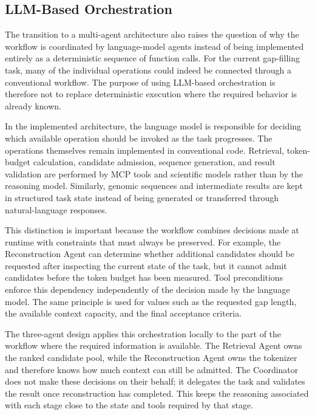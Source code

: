 \subsection{LLM-Based Orchestration}
\label{subsec:llm-orchestration}

The transition to a multi-agent architecture also raises the question of why
the workflow is coordinated by language-model agents instead of being
implemented entirely as a deterministic sequence of function calls. For the
current gap-filling task, many of the individual operations could indeed be
connected through a conventional workflow. The purpose of using LLM-based
orchestration is therefore not to replace deterministic execution where the
required behavior is already known.

In the implemented architecture, the language model is responsible for deciding
which available operation should be invoked as the task progresses. The
operations themselves remain implemented in conventional code. Retrieval,
token-budget calculation, candidate admission, sequence generation, and result
validation are performed by MCP tools and scientific models rather than by the
reasoning model. Similarly, genomic sequences and intermediate results are kept
in structured task state instead of being generated or transferred through
natural-language responses.

This distinction is important because the workflow combines decisions made at
runtime with constraints that must always be preserved. For example, the
Reconstruction Agent can determine whether additional candidates should be
requested after inspecting the current state of the task, but it cannot admit
candidates before the token budget has been measured. Tool preconditions
enforce this dependency independently of the decision made by the language
model. The same principle is used for values such as the requested gap length,
the available context capacity, and the final acceptance criteria.

The three-agent design applies this orchestration locally to the part of the
workflow where the required information is available. The Retrieval Agent owns
the ranked candidate pool, while the Reconstruction Agent owns the tokenizer
and therefore knows how much context can still be admitted. The Coordinator
does not make these decisions on their behalf; it delegates the task and
validates the result once reconstruction has completed. This keeps the
reasoning associated with each stage close to the state and tools required by
that stage.

